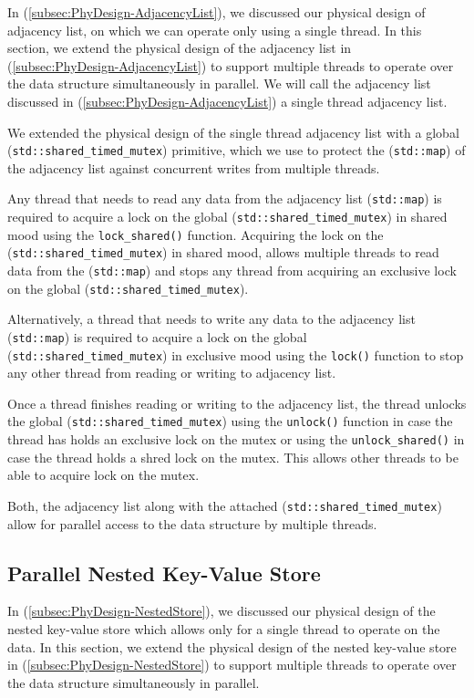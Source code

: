 {In (\ref{subsec:PhyDesign-AdjacencyList}), we discussed our physical design of adjacency list, on which we can operate only using a single thread. In this section, we extend the physical design of the adjacency list in (\ref{subsec:PhyDesign-AdjacencyList}) to support multiple threads to operate over the data structure simultaneously in parallel. We will call the adjacency list discussed in (\ref{subsec:PhyDesign-AdjacencyList}) a single thread adjacency list.

We extended the physical design of the single thread adjacency list with a global (\texttt{std::shared\_timed\_mutex}) primitive, which we use to protect the (\texttt{std::map}) of the adjacency list against concurrent writes from multiple threads.

Any thread that needs to read any data from the adjacency list (\texttt{std::map}) is required to acquire a lock on the global (\texttt{std::shared\_timed\_mutex}) in shared mood using the \texttt{lock\_shared()} function. Acquiring the lock on the (\texttt{std::shared\_timed\_mutex}) in shared mood, allows multiple threads to read data from the (\texttt{std::map}) and stops any thread from acquiring an exclusive lock on the global (\texttt{std::shared\_timed\_mutex}). 

Alternatively, a thread that needs to write any data to the adjacency list (\texttt{std::map}) is required to acquire a lock on the global (\texttt{std::shared\_timed\_mutex}) in exclusive mood using the \texttt{lock()} function to stop any other thread from reading or writing to adjacency list. 

Once a thread finishes reading or writing to the adjacency list, the thread unlocks the global (\texttt{std::shared\_timed\_mutex}) using the  \texttt{unlock()} function in case the thread has holds an exclusive lock on the mutex or using the  \texttt{unlock\_shared()} in case the thread holds a shred lock on the mutex. This allows other threads to be able to acquire lock on the mutex.

Both, the adjacency list along with the attached (\texttt{std::shared\_timed\_mutex}) allow for parallel access to the data structure by multiple threads.


\subsection{Parallel Nested Key-Value Store}
\label{subsec:PhyDesign-ParallelNestedStore}

In (\ref{subsec:PhyDesign-NestedStore}), we discussed our physical design of the nested key-value store which allows only for a single thread to operate on the data. In this section, we extend the physical design of the nested key-value store in (\ref{subsec:PhyDesign-NestedStore}) to support multiple threads to operate over the data structure simultaneously in parallel.

}
